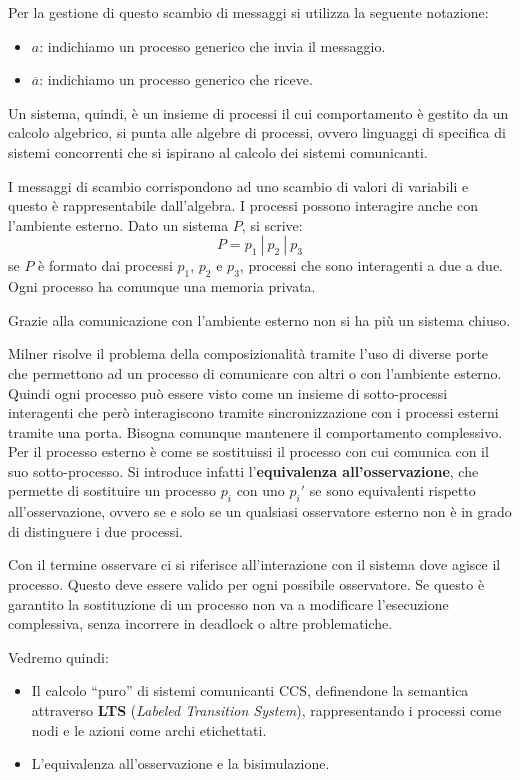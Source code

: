 Per la gestione di questo scambio di messaggi si utilizza la seguente notazione:
\begin{itemize}
    \item \textbf{$a$}: indichiamo un processo generico che invia il messaggio.
    \item \textbf{$\overline{a}$}: indichiamo un processo generico che riceve.
\end{itemize}

Un sistema, quindi, è un insieme di processi il cui comportamento è gestito da
un calcolo algebrico, si punta alle algebre di processi, ovvero linguaggi di
specifica di sistemi concorrenti che si ispirano al calcolo dei sistemi comunicanti.

I messaggi di scambio corrispondono ad uno scambio di valori di variabili e questo
è rappresentabile dall'algebra. I processi possono interagire anche con l'ambiente
esterno. Dato un sistema $P$, si scrive: $$P = p_1 \ | \ p_2 \ | \ p_3$$ se $P$
è formato dai processi $p_1$, $p_2$ e $p_3$, processi che sono interagenti a
due a due. Ogni processo ha comunque una memoria privata.

Grazie alla comunicazione con l'ambiente esterno non si ha più un sistema chiuso.

Milner risolve il problema della composizionalità tramite l'uso di diverse porte
che permettono ad un processo di comunicare con altri o con l'ambiente esterno.
Quindi ogni processo può essere visto come un insieme di sotto-processi interagenti
che però interagiscono tramite sincronizzazione con i processi esterni tramite
una porta. Bisogna comunque mantenere il comportamento complessivo. Per il
processo esterno è come se sostituissi il processo con cui comunica con il suo
sotto-processo. Si introduce infatti l'\textbf{equivalenza all'osservazione},
che permette di sostituire un processo $p_i$ con uno $p_i'$ se sono equivalenti
rispetto all'osservazione, ovvero se e solo se un qualsiasi osservatore esterno
non è in grado di distinguere i due processi.

Con il termine osservare ci si riferisce all'interazione con il sistema dove
agisce il processo. Questo deve essere valido per ogni possibile osservatore.
Se questo è garantito la sostituzione di un processo non va a modificare
l'esecuzione complessiva, senza incorrere in deadlock o altre problematiche.

Vedremo quindi:
\begin{itemize}
    \item Il calcolo “puro” di sistemi comunicanti CCS, definendone la semantica
          attraverso \textbf{LTS} (\textit{Labeled Transition System}), rappresentando
          i processi come nodi e le azioni come archi etichettati.
    \item L'equivalenza all'osservazione e la bisimulazione.
\end{itemize}
